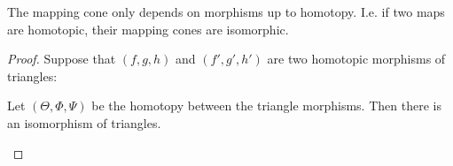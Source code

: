     \begin{lemma}
        The mapping cone only depends on morphisms up to homotopy. I.e. if two maps are homotopic, their mapping cones are isomorphic.
    \end{lemma}

    \begin{proof}
        Suppose that $(f,g,h)$ and $(f',g',h')$ are two homotopic morphisms of triangles:
        \begin{center}
        \end{center}
        Let $(\Theta,\Phi,\Psi)$ be the homotopy between the triangle morphisms. Then there is an isomorphism of triangles.
        \begin{center}
\end{center}
\end{proof}
